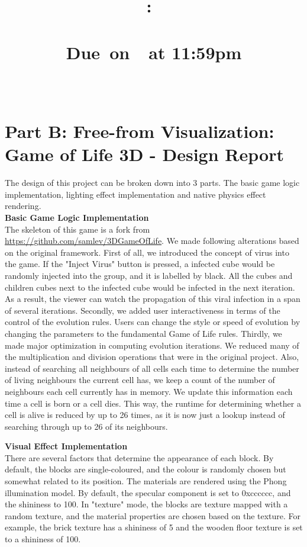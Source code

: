 \documentclass{article}
\title{
    \vspace{2in}
    \textmd{\textbf{\hmwkClass:\ \hmwkTitle}}\\
        \textmd{\textbf{\hmwkDetails}}\\
    \normalsize\vspace{0.1in}\small{Due\ on\ \hmwkDueDate\ at 11:59pm}\\
    \vspace{0.1in}\large{\textit{\hmwkClassInstructor}}
    \vspace{3in}
}
\author{
     \textbf{\hmwkAuthorNameA}
     \texttt{\hmwkAuthorStudentNumberA} \\
      \textbf{\hmwkAuthorNameB} 
     \texttt{\hmwkAuthorStudentNumberB}
}
\date{}
\begin{document}
\maketitle

\pagebreak

\section{Part B: Free-from Visualization: Game of Life 3D - Design Report}
The design of this project can be broken down into 3 parts. The basic game logic implementation, lighting effect implementation and native physics effect rendering.\\

\textbf{Basic Game Logic Implementation}\\

The skeleton of this game is a fork from \url{https://github.com/samlev/3DGameOfLife}. We made following alterations based on the original framework. First of all, we introduced the concept of virus into the game. If the "Inject Virus" button is pressed, a infected cube would be randomly injected into the group, and it is labelled by black. All the cubes and children cubes next to the infected cube would be infected in the next iteration. As a result, the viewer can watch the propagation of this viral infection in a span of several iterations. Secondly, we added user interactiveness in terms of the control of the evolution rules. Users can change the style or speed of evolution by changing the parameters to the fundamental Game of Life rules. Thirdly, we made major optimization in computing evolution iterations. We reduced many of the multiplication and division operations that were in the original project. Also, instead of searching all neighbours of all cells each time to determine the number of living neighbours the current cell has, we keep a count of the number of neighbours each cell currently has in memory. We update this information each time a cell is born or a cell dies. This way, the runtime for determining whether a cell is alive is reduced by up to 26 times, as it is now just a lookup instead of searching through up to 26 of its neighbours.

\textbf{Visual Effect Implementation}\\
There are several factors that determine the appearance of each block. By default, the blocks are single-coloured, and the colour is randomly chosen but somewhat related to its position. The materials are rendered using the Phong illumination model. By default, the specular component is set to 0xcccccc, and the shininess to 100. In "texture" mode, the blocks are texture mapped with a random texture, and the material properties are chosen based on the texture. For example, the brick texture has a shininess of 5 and the wooden floor texture is set to a shininess of 100. 
\end{document}
